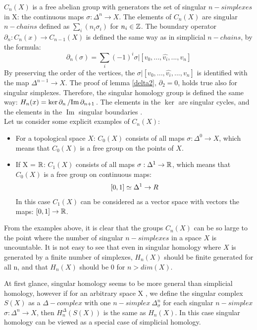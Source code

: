 \documentclass[11pt,a4paper]{report}
\DeclareMathOperator{\Ima}{Im}
\begin{document}
     $C_n(X)$ is a free abelian group with generators the set of singular $n-simplexes$ in X: the continuous maps $\sigma: \Delta^n \rightarrow X$. The elements of $C_n(X)$ are singular $n-chains$ defined as $\sum_i(n_i\sigma_i)$ for $n_i \in \mathbb{Z}$. The boundary operator $\partial_n: C_n(x) \rightarrow C_{n-1}(X)$ is defined the same way as in simplicial $n-chains$, by the formula:
     \[
		         \partial_n(\sigma) = \sum\limits_i (-1)^i \sigma | [v_0, ... ,\hat{v_i}, ... , v_n]
              \]
     By preserving the order of the vertices, the $\sigma |[v_0, ... ,\hat{v_i}, ... , v_n]$ is identified with the map $\Delta^{n-1} \rightarrow X$. The proof of lemma \ref{delta2}, $\partial_2 = 0$, holds true also for singular simplexes. Therefore, the singular homology group is defined the same way: $H_n(x) = \ker\partial_n \left/ \Ima \partial_{n+1} \right.$. The elements in the $\ker$ are singular cycles, and the elements in the $\Ima$ singular boundaries \cite{hatcher}. \\

      Let us consider some explicit examples of $C_n(X)$:
      \begin{itemize}
       \item
      For a topological space $X$:
      $C_0(X)$ consists of all maps $\sigma: \Delta^0 \rightarrow X$, which means that $C_0(X)$ is a free group on the points of $X$.
      \item
      If X = $\mathbb{R}$: $C_1(X)$ consists of all maps $\sigma: \Delta^1 \rightarrow \mathbb{R}$, which means that $C_0(X)$ is a free group on continuous maps:
      \[
        [0, 1] \simeq \Delta^1 \rightarrow \\R
      \]
      In this case $C_1(X)$ can be considered as a vector space with vectors the maps: $[0, 1] \rightarrow \mathbb{R}$.
      \end{itemize}

    From the examples above, it is clear that the groups $C_n(X)$ can be so large to the point where the number of singular $n-simplexes$ in a space $X$ is uncountable. It is not easy to see that even in singular homology where $X$ is generated by a finite number of simplexes, $H_n(X)$ should be finite generated for all n, and that $H_n(X)$ should be 0 for $n > dim(X)$.

    At first glance, singular homology seems to be more general than simplicial homology, however if for an arbitrary space X , we define the singular complex $S(X)$ as a $\Delta-complex$ with one $n-simplex \ \Delta_\sigma^n$ for each singular $n-simplex$ $\sigma: \Delta^n \rightarrow X$, then $H_n^\Delta(S(X))$ is the same as $H_n(X)$. In this case singular homology can be viewed as a special case of simplicial homology.
\end{document}
